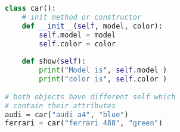 
\begin{lstlisting}[language=python]
class car(): 
	# init method or constructor 
	def __init__(self, model, color): 
		self.model = model 
		self.color = color 
		
	def show(self): 
		print("Model is", self.model ) 
		print("color is", self.color ) 
		
# both objects have different self which 
# contain their attributes 
audi = car("audi a4", "blue") 
ferrari = car("ferrari 488", "green") 
\end{lstlisting}
